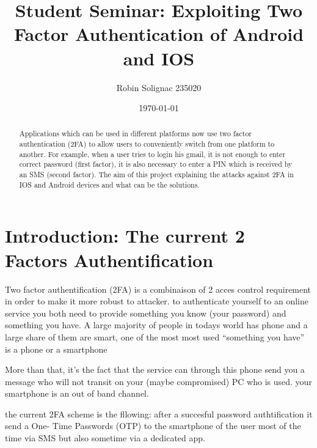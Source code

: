 \documentclass[11pt]{article}
\title{Student Seminar: Exploiting Two Factor Authentication of Android and IOS}
\author{Robin Solignac 235020}
\date{\today}
\begin{document}
\maketitle
\begin{abstract}
Applications  which  can  be  used  in  different  platforms  now  use  two
factor authentication (2FA) to allow users to conveniently switch from one platform to another.
For example, when a user tries to login his gmail, it is not enough to enter correct password 
(first factor), it is also necessary to enter a PIN which is received by an SMS (second factor).
The aim of this project explaining the attacks against 2FA in IOS and Android devices and 
what can be the solutions. 
\end{abstract}

\section{Introduction: The current 2 Factors Authentification}

Two factor authentification (2FA) is a combinaison of 2 acces control requirement in 
order to make it more robust to attacker. to authenticate yourself to an online 
service you both need to provide something you know (your password) and 
something you have. 
A large majority of people in todays world has phone and a large share of 
them are smart, one of the most most used ``something you have''  is a phone or 
a smartphone

More than that, it's the fact that the service can through this phone
send you a message  who will not transit on your (maybe compromised) PC 
who is used. your smartphone is an out of band channel.

\begin{comment} But it's not the only fact of having a phone or a phonenumber who is 
used in pratice to authenticate but the fact that services can send message to it and that that 
user can get it without using the main (maybe compromised) communication 
channel. This is called an . 
\end{comment} 

the current 2FA scheme is the fllowing: after a succesful password authtification it send a One-
Time Passwords (OTP) to the smartphone of the user most of the time via SMS 
but also sometime via a dedicated app.

\end{document}
